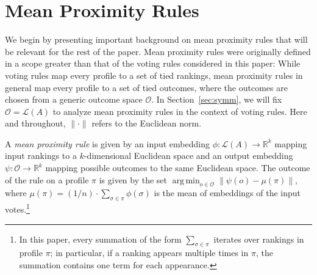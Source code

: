 \documentclass[prodmode]{acmsmall-ec14}
\newcommand{\calL}{{\mathcal{L}}}
\newcommand{\rank}{{\calL(A)}}
\newcommand{\calO}{{\mathcal{O}}}
\DeclareMathOperator*{\argmin}{arg\,min}
\newcommand{\kibitz}[2]{\ifnum\Comments=1\textcolor{#1}{#2}\fi}
\newcommand{\ns}[1]{\kibitz{red} {[NS: #1]}}
\begin{document}



\section{Mean Proximity Rules}
\label{sec:mpr}

We begin by  presenting important background on mean proximity rules that will be relevant for the rest of the paper. Mean proximity rules were originally defined in a scope greater than that of the voting rules considered in this paper: While voting rules map every profile to a set of tied rankings, mean proximity rules in general map every profile to a set of tied outcomes, where the outcomes are chosen from a generic outcome space $\calO$. In Section~\ref{sec:symm}, we will fix $\calO = \rank$ to analyze mean proximity rules in the context of voting rules. Here and throughout, $\|\cdot\| $ refers to the Euclidean norm.

\begin{definition}
A \emph{mean proximity rule} is given by an input embedding $\phi: \rank \rightarrow \mathbb{R}^k$ mapping input rankings to a $k$-dimensional Euclidean space and an output embedding $\psi: \calO \rightarrow \mathbb{R}^k$ mapping possible outcomes to the same Euclidean space. The outcome of the rule on a profile $\pi$ is given by the set $\argmin_{o \in \calO} \|\psi(o) - \mu(\pi) \|$, where $\mu(\pi) = (1/n) \cdot \sum_{\sigma \in \pi} \phi(\sigma)$ is the mean of embeddings of the input votes.\footnote{In this paper, every summation of the form $\sum_{\sigma \in \pi}$  iterates over rankings in profile $\pi$; in particular, if a ranking appears multiple times in $\pi$, the summation contains one term for each appearance.}
\end{definition}
\end{document}
